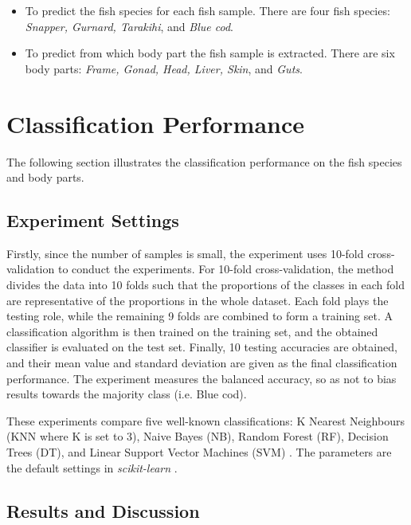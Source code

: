 \documentclass[runningheads]{llncs}
\begin{document}
\begin{itemize}
	\item To predict the fish species for each fish sample. There are four fish species: \textit{Snapper, Gurnard, Tarakihi}, and \textit{Blue cod}.
	\item To predict from which body part the fish sample is extracted. There are six body parts: \textit{Frame, Gonad, Head, Liver, Skin}, and \textit{Guts}.
\end{itemize} 

\section{Classification Performance}

The following section illustrates the classification performance on the fish species and body parts.

\subsection{Experiment Settings}

Firstly, since the number of samples is small, the experiment uses 10-fold cross-validation to conduct the experiments. 
For 10-fold cross-validation, the method divides the data into 10 folds such that the proportions of the classes in each fold are representative of the proportions in the whole dataset. 
Each fold plays the testing role, while the remaining 9 folds are combined to form a training set. 
A classification algorithm is then trained on the training set, and the obtained classifier is evaluated on the test set. 
Finally, 10 testing accuracies are obtained, and their mean value and standard deviation are given as the final classification performance. 
The experiment measures the balanced accuracy, so as not to bias results towards the majority class (i.e. Blue cod).

These experiments compare five well-known classifications: K Nearest Neighbours (KNN where K is set to 3), Naive Bayes (NB), Random Forest (RF), Decision Trees (DT), and Linear Support Vector Machines (SVM)  \cite{fix1989discriminatory,hand2001idiot,ho1995random,loh2011classification,cortes1995support}. 
The parameters are the default settings in \textit{scikit-learn} \cite{pedregosa2011scikit}.

\subsection{Results and Discussion}
\end{document}
